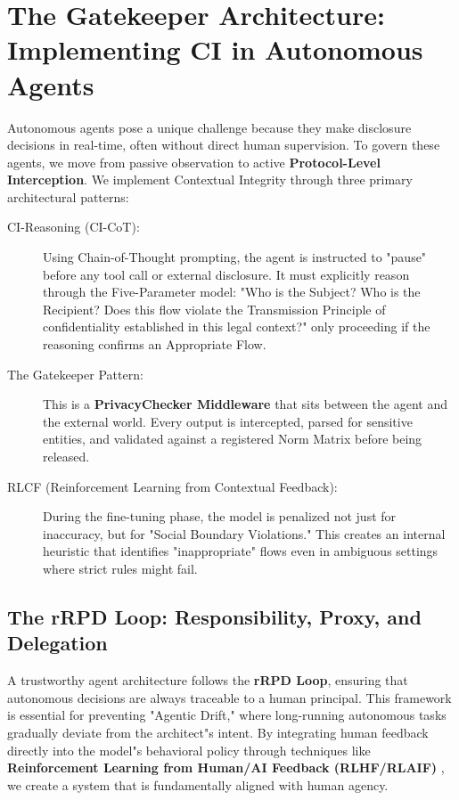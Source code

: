 \section{The Gatekeeper Architecture: Implementing CI in Autonomous Agents}
\label{sec:ci_agents_gatekeeper}

Autonomous agents pose a unique challenge because they make disclosure decisions in real-time, often without direct human supervision. To govern these agents, we move from passive observation to active \textbf{Protocol-Level Interception}. We implement Contextual Integrity through three primary architectural patterns:

\begin{description}
  \item[CI-Reasoning (CI-CoT):] Using Chain-of-Thought prompting, the agent is instructed to "pause" before any tool call or external disclosure. It must explicitly reason through the Five-Parameter model: "Who is the Subject? Who is the Recipient? Does this flow violate the Transmission Principle of confidentiality established in this legal context?" only proceeding if the reasoning confirms an Appropriate Flow.
  \item[The Gatekeeper Pattern:] This is a \textbf{PrivacyChecker Middleware} that sits between the agent and the external world. Every output is intercepted, parsed for sensitive entities, and validated against a registered Norm Matrix before being released.
  \item[RLCF (Reinforcement Learning from Contextual Feedback):] During the fine-tuning phase, the model is penalized not just for inaccuracy, but for "Social Boundary Violations." This creates an internal heuristic that identifies "inappropriate" flows even in ambiguous settings where strict rules might fail.
\end{description}

\subsection{The rRPD Loop: Responsibility, Proxy, and Delegation}
A trustworthy agent architecture follows the \textbf{rRPD Loop}, ensuring that autonomous decisions are always traceable to a human principal. This framework is essential for preventing "Agentic Drift," where long-running autonomous tasks gradually deviate from the architect"s intent. By integrating human feedback directly into the model"s behavioral policy through techniques like \textbf{Reinforcement Learning from Human/AI Feedback (RLHF/RLAIF)} \cite{ouyang2022}, we create a system that is fundamentally aligned with human agency.

